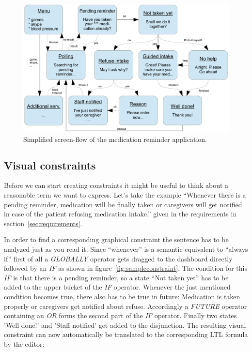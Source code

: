 \documentclass[conference]{IEEEtran}
\begin{document}
\begin{figure}[htbp]
  \centering
  \includegraphics[width=\linewidth]{stm.pdf} %
  \caption{Simplified screen-flow of the medication reminder application.
  }
  \label{fig:medicationreminder}
\end{figure}





\subsection{Visual constraints}

Before we can start creating constraints it might be useful to think about a reasonable term we want to express. Let's take the example ``Whenever there is a pending reminder, medication will be finally taken or caregivers will get notified in case of the patient refusing medication intake.'' given in the requirements in section~\ref{sec:requirements}.

In order to find a corresponding graphical constraint the sentence has to be analyzed just as you read it. Since ``whenever'' is a semantic equivalent to ``always if'' first of all a \emph{GLOBALLY} operator gets dragged to the dashboard directly followed by an \emph{IF} as shown in figure~\ref{fig:sampleconstraint}. The condition for this \emph{IF} is that there is a pending reminder, so a state ``Not taken yet'' has to be added to the upper bucket of the \emph{IF} operator.
Whenever the just mentioned condition becomes true, there also has to be true in future: Medication is taken properly or caregivers get notified about refuse. Accordingly a \emph{FUTURE} operator containing an \emph{OR} forms the second part of the \emph{IF} operator. Finally two states 'Well done!' and 'Staff notified' get added to the disjunction. The resulting visual constraint can now automatically be translated to the corresponding LTL formula by the editor:
\end{document}
